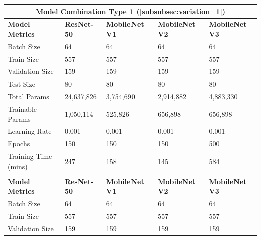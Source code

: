 \begin{table}[H]
\centering
\begin{tabularx}{\textwidth}{@{} *5{X} @{}}
\toprule
\multicolumn{5}{c}{\textbf{Model Combination Type 1 (\ref{subsubsec:variation_1})}}                                    \\ \midrule
\raggedright \textbf{Model Metrics}           & \textbf{ResNet-50} & \textbf{MobileNet V1} & \textbf{MobileNet V2} & \textbf{MobileNet V3} \\ \midrule
Batch Size           & 64          &   64           &  64            &  64            \\ \midrule
Train Size           & 557          &  557            & 557             &  557             \\  \midrule
Validation Size      & 159          &  159            & 159             &  159            \\ \midrule
Test Size            & 80          &   80           &   80           &  80            \\ \midrule
\raggedright Total Params     &   24,637,826          &  3,754,690            &  2,914,882            &    4,883,330          \\ \midrule
\raggedright Trainable Params &  1,050,114         & 525,826             & 656,898             &   656,898           \\ \midrule
Learning Rate        &   0.001        & 0.001             &  0.001            &  0.001            \\ \midrule
Epochs               &  150         &  150            &  150            &   500           \\ \midrule
Training Time (mins)        & 247          & 158              & 145             &  584            \\ \midrule
\addlinespace
\addlinespace
\midrule
\multicolumn{5}{c}{\textbf{Model Combination Type 2 (\ref{subsubsec:variation_2})}}                                    \\ \midrule
\raggedright \textbf{Model Metrics}           & \textbf{ResNet-50} & \textbf{MobileNet V1} & \textbf{MobileNet V2} & \textbf{MobileNet V3} \\ \midrule
Batch Size           &  64         & 64             &   64           &   64           \\ \midrule
Train Size           &   557        & 557             &  557            &  557            \\  \midrule
Validation Size      &   159        & 159             &  159            &  159            \\ \midrule

\end{tabularx}
\end{table}
